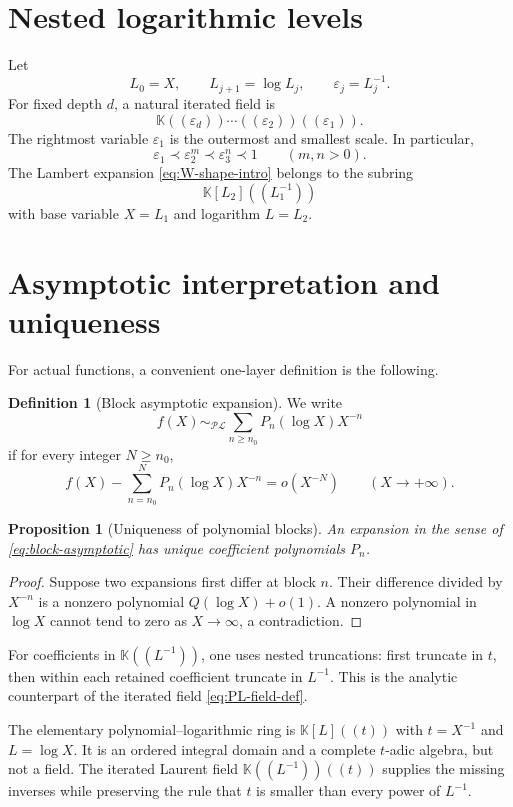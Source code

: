 \documentclass[11pt,oneside]{book}
\newtheorem{proposition}[theorem]{Proposition}
\theoremstyle{definition}
\newtheorem{definition}[theorem]{Definition}
\theoremstyle{remark}
\newcommand{\K}{\mathbb K}
\newcommand{\PL}{\mathscr{PL}}
\newcommand{\precdom}{\prec}
\newcommand{\eps}{\varepsilon}
\begin{document}
\section{Nested logarithmic levels}
Let
\[
 L_0=X,\qquad L_{j+1}=\log L_j,
 \qquad \eps_j=L_j^{-1}.
\]
For fixed depth $d$, a natural iterated field is
\begin{equation}\label{eq:nested-field}
 \K((\eps_d))\cdots((\eps_2))((\eps_1)).
\end{equation}
The rightmost variable $\eps_1$ is the outermost and smallest scale.  In
particular,
\[
 \eps_1\precdom \eps_2^m\precdom\eps_3^n\precdom1
 \qquad(m,n>0).
\]
The Lambert expansion \eqref{eq:W-shape-intro} belongs to the subring
\[
 \K[L_2]((L_1^{-1}))
\]
with base variable $X=L_1$ and logarithm $L=L_2$.

\section{Asymptotic interpretation and uniqueness}
For actual functions, a convenient one-layer definition is the following.

\begin{definition}[Block asymptotic expansion]
We write
\begin{equation}\label{eq:block-asymptotic}
 f(X)\sim_{\PL}\sum_{n\ge n_0}P_n(\log X)X^{-n}
\end{equation}
if for every integer $N\ge n_0$,
\[
 f(X)-\sum_{n=n_0}^{N}P_n(\log X)X^{-n}=o(X^{-N})
 \qquad(X\to+\infty).
\]
\end{definition}

\begin{proposition}[Uniqueness of polynomial blocks]
An expansion in the sense of \eqref{eq:block-asymptotic} has unique
coefficient polynomials $P_n$.
\end{proposition}
\begin{proof}
Suppose two expansions first differ at block $n$.  Their difference divided by
$X^{-n}$ is a nonzero polynomial $Q(\log X)+o(1)$.  A nonzero polynomial in
$\log X$ cannot tend to zero as $X\to\infty$, a contradiction.
\end{proof}

For coefficients in $\K((L^{-1}))$, one uses nested truncations: first truncate
in $t$, then within each retained coefficient truncate in $L^{-1}$.  This is
the analytic counterpart of the iterated field \eqref{eq:PL-field-def}.

\begin{summarybox}
The elementary polynomial--logarithmic ring is $\K[L]((t))$ with
$t=X^{-1}$ and $L=\log X$.  It is an ordered integral domain and a complete
$t$-adic algebra, but not a field.  The iterated Laurent field
$\K((L^{-1}))((t))$ supplies the missing inverses while preserving the rule
that $t$ is smaller than every power of $L^{-1}$.
\end{summarybox}
\end{document}
